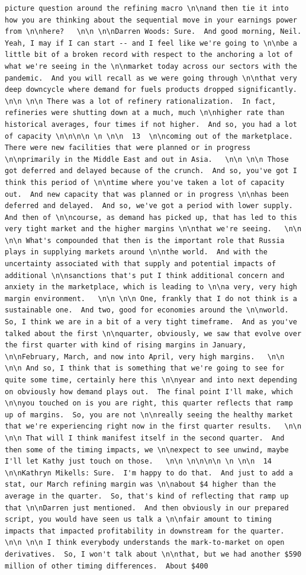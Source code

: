 \documentclass[
  letterpaper,
  DIV=11,
  numbers=noendperiod]{scrreprt}
\begin{document}
\begin{verbatim}
picture question around the refining macro \n\nand then tie it into how you are thinking about the sequential move in your earnings power from \n\nhere?   \n\n \n\nDarren Woods: Sure.  And good morning, Neil.  Yeah, I may if I can start -- and I feel like we're going to \n\nbe a little bit of a broken record with respect to the anchoring a lot of what we're seeing in the \n\nmarket today across our sectors with the pandemic.  And you will recall as we were going through \n\nthat very deep downcycle where demand for fuels products dropped significantly.   \n\n \n\n There was a lot of refinery rationalization.  In fact, refineries were shutting down at a much, much \n\nhigher rate than historical averages, four times if not higher.  And so, you had a lot of capacity \n\n\n\n \n \n\n  13  \n\ncoming out of the marketplace.  There were new facilities that were planned or in progress \n\nprimarily in the Middle East and out in Asia.   \n\n \n\n Those got deferred and delayed because of the crunch.  And so, you've got I think this period of \n\ntime where you've taken a lot of capacity out.  And new capacity that was planned or in progress \n\nhas been deferred and delayed.  And so, we've got a period with lower supply.  And then of \n\ncourse, as demand has picked up, that has led to this very tight market and the higher margins \n\nthat we're seeing.   \n\n \n\n What's compounded that then is the important role that Russia plays in supplying markets around \n\nthe world.  And with the uncertainty associated with that supply and potential impacts of additional \n\nsanctions that's put I think additional concern and anxiety in the marketplace, which is leading to \n\na very, very high margin environment.   \n\n \n\n One, frankly that I do not think is a sustainable one.  And two, good for economies around the \n\nworld.  So, I think we are in a bit of a very tight timeframe.  And as you've talked about the first \n\nquarter, obviously, we saw that evolve over the first quarter with kind of rising margins in January, \n\nFebruary, March, and now into April, very high margins.   \n\n \n\n And so, I think that is something that we're going to see for quite some time, certainly here this \n\nyear and into next depending on obviously how demand plays out.  The final point I'll make, which \n\nyou touched on is you are right, this quarter reflects that ramp up of margins.  So, you are not \n\nreally seeing the healthy market that we're experiencing right now in the first quarter results.   \n\n \n\n That will I think manifest itself in the second quarter.  And then some of the timing impacts, we \n\nexpect to see unwind, maybe I'll let Kathy just touch on those.   \n\n \n\n\n\n \n \n\n  14  \n\nKathryn Mikells: Sure.  I'm happy to do that.  And just to add a stat, our March refining margin was \n\nabout $4 higher than the average in the quarter.  So, that's kind of reflecting that ramp up that \n\nDarren just mentioned.  And then obviously in our prepared script, you would have seen us talk a \n\nfair amount to timing impacts that impacted profitability in downstream for the quarter.   \n\n \n\n I think everybody understands the mark-to-market on open derivatives.  So, I won't talk about \n\nthat, but we had another $590 million of other timing differences.  About $400 
\end{verbatim}
\end{document}
